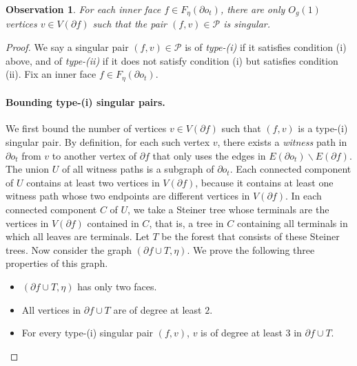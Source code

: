 \documentclass[a4paper,11pt]{article}
\numberwithin{lemma}{section}
\newtheorem{observation}[lemma]{Observation}
\begin{document}
\begin{observation} \label{obs-O1singular}
For each inner face $f \in F_\eta(\partial o_t)$, there are only $O_g(1)$ vertices $v \in V(\partial f)$ such that the pair $(f,v) \in \mathcal{P}$ is singular.
\end{observation}
\begin{proof}
We say a singular pair $(f,v) \in \mathcal{P}$ is of \textit{type-(i)} if it satisfies condition (i) above, and of \textit{type-(ii)} if it does not satisfy condition (i) but satisfies condition (ii).
Fix an inner face $f \in F_\eta(\partial o_t)$.

\paragraph{Bounding type-(i) singular pairs.}
We first bound the number of vertices $v \in V(\partial f)$ such that $(f,v)$ is a type-(i) singular pair.
By definition, for each such vertex $v$, there exists a \textit{witness} path in $\partial o_t$ from $v$ to another vertex of $\partial f$ that only uses the edges in $E(\partial o_t) \backslash E(\partial f)$.
The union $U$ of all witness paths is a subgraph of $\partial o_t$.
Each connected component of $U$ contains at least two vertices in $V(\partial f)$, because it contains at least one witness path whose two endpoints are different vertices in $V(\partial f)$.
In each connected component $C$ of $U$, we take a Steiner tree whose terminals are the vertices in $V(\partial f)$ contained in $C$, that is, a tree in $C$ containing all terminals in which all leaves are terminals.
Let $T$ be the forest that consists of these Steiner trees.
Now consider the graph $(\partial f \cup T, \eta)$.
We prove the following three properties of this graph.
\begin{itemize}
 \item $(\partial f \cup T, \eta)$ has only two faces.
 \item All vertices in $\partial f \cup T$ are of degree at least $2$.
 \item For every type-(i) singular pair $(f,v)$, $v$ is of degree at least $3$ in $\partial f \cup T$.
\end{itemize}


\end{proof}
\end{document}
